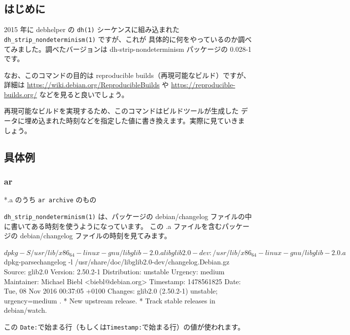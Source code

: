 \documentclass[mingoth,a4paper]{jsarticle}
\begin{document}

\subsection{はじめに}

2015 年に debhelper の \verb|dh(1)| シーケンスに組み込まれた
\verb|dh_strip_nondeterminism(1)| ですが、これが
具体的に何をやっているのか調べてみました。調べたバージョンは
dh-strip-nondeterminism パッケージの 0.028-1 です。

なお、このコマンドの目的は reproducible builds（再現可能なビルド）ですが、詳細は
\url{https://wiki.debian.org/ReproducibleBuilds} や
\url{https://reproducible-builds.org/} などを見ると良いでしょう。

再現可能なビルドを実現するため、このコマンドはビルドツールが生成した
データに埋め込まれた時刻などを指定した値に書き換えます。実際に見ていきま
しょう。

\subsection{具体例}
\subsubsection{ar}
*.a のうち \verb|ar archive| のもの


\verb|dh_strip_nondeterminism(1)| は、パッケージの debian/changelog
ファイルの中に書いてある時刻を使うようになっています。
この .a ファイルを含むパッケージの debian/changelog ファイルの時刻を見てみます。
\begin{commandline}
$ dpkg -S /usr/lib/x86_64-linux-gnu/libglib-2.0.a
libglib2.0-dev: /usr/lib/x86_64-linux-gnu/libglib-2.0.a
$ dpkg-parsechangelog -l /usr/share/doc/libglib2.0-dev/changelog.Debian.gz
Source: glib2.0
Version: 2.50.2-1
Distribution: unstable
Urgency: medium
Maintainer: Michael Biebl <biebl@debian.org>
Timestamp: 1478561825
Date: Tue, 08 Nov 2016 00:37:05 +0100
Changes:
 glib2.0 (2.50.2-1) unstable; urgency=medium
 .
   * New upstream release.
   * Track stable releases in debian/watch.
\end{commandline}
この \verb|Date:|で始まる行（もしくは\verb|Timestamp:|で始まる行）の値が使われます。
\end{document}
